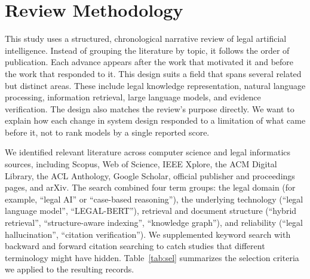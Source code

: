 \section{Review Methodology}
\label{sec:method}

This study uses a structured, chronological narrative review of legal artificial intelligence.
Instead of grouping the literature by topic, it follows the order of publication. Each advance
appears after the work that motivated it and before the work that responded to it. This design
suits a field that spans several related but distinct areas. These include legal knowledge
representation, natural language processing, information retrieval, large language models, and
evidence verification. The design also matches the review's purpose directly. We want to explain how
each change in system design responded to a limitation of what came before it, not to rank models by
a single reported score.

We identified relevant literature across computer science and legal informatics sources, including
Scopus, Web of Science, IEEE Xplore, the ACM Digital Library, the ACL Anthology, Google Scholar,
official publisher and proceedings pages, and arXiv. The search combined four term groups: the legal
domain (for example, ``legal AI'' or ``case-based reasoning''), the underlying technology (``legal
language model'', ``LEGAL-BERT''), retrieval and document structure (``hybrid retrieval'',
``structure-aware indexing'', ``knowledge graph''), and reliability (``legal hallucination'',
``citation verification''). We supplemented keyword search with backward and forward citation
searching to catch studies that different terminology might have hidden. Table~\ref{tab:sel}
summarizes the selection criteria we applied to the resulting records.


